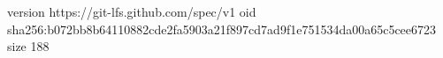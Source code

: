 version https://git-lfs.github.com/spec/v1
oid sha256:b072bb8b64110882cde2fa5903a21f897cd7ad9f1e751534da00a65c5cee6723
size 188
